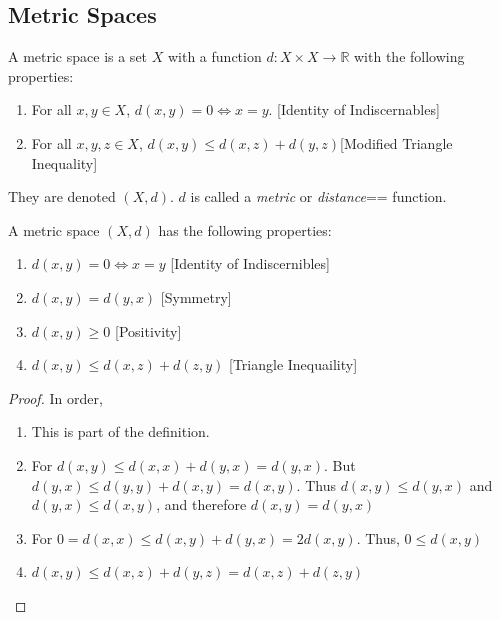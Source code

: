 \documentclass[crop=false,class=book,oneside]{standalone}
\begin{document}
        \subsection{Metric Spaces}
            \begin{definition}
            A metric space is a set $X$ with a function $d:X\times X\rightarrow \mathbb{R}$ with the following properties:
            \begin{enumerate}
            \item For all $x,y\in X$, $d(x,y) = 0\Leftrightarrow x=y$. \hfill [Identity of Indiscernables]
            \item For all $x,y,z\in X$, $d(x,y) \leq d(x,z)+d(y,z)$\hfill [Modified Triangle Inequality]
            \end{enumerate}
            They are denoted $(X,d)$. $d$ is called a
            \textit{metric} or \textit{distance}== function.
            \end{definition}
            \begin{theorem}
            A metric space $(X,d)$ has the following properties:
            \begin{enumerate}
                \item $d(x,y) = 0 \Leftrightarrow x=y$ \hfill [Identity of Indiscernibles]
                \item $d(x,y) = d(y,x)$ \hfill [Symmetry]
                \item $d(x,y) \geq 0$ \hfill [Positivity]
                \item $d(x,y) \leq d(x,z)+d(z,y)$ \hfill [Triangle Inequaility]
            \end{enumerate}
            \end{theorem}
            \begin{proof}
            In order,
            \begin{enumerate}
                \item This is part of the definition.
                \item For $d(x,y) \leq d(x,x)+d(y,x) = d(y,x)$. But $d(y,x) \leq d(y,y)+d(x,y) = d(x,y)$. Thus $d(x,y)\leq d(y,x)$ and $d(y,x) \leq d(x,y)$, and therefore $d(x,y) = d(y,x)$
                \item For $0=d(x,x) \leq d(x,y)+d(y,x) = 2d(x,y)$. Thus, $0\leq d(x,y)$
                \item $d(x,y)\leq d(x,z)+d(y,z) = d(x,z)+d(z,y)$
            \end{enumerate}
            \end{proof}
\end{document}
